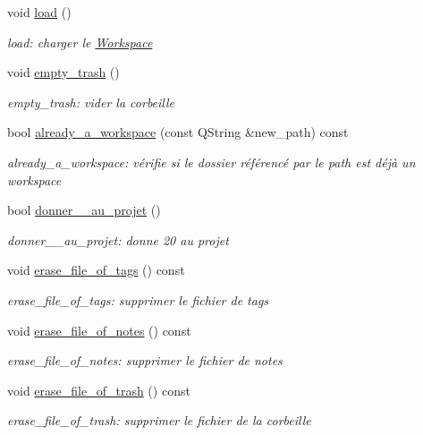 \begin{DoxyCompactItemize}
void \hyperlink{classworkspace_1_1_workspace_af3d7148dc6d3a11887196d24fa078fcb}{load} ()
\begin{DoxyCompactList}\small\item\em load\-: charger le \hyperlink{classworkspace_1_1_workspace}{Workspace} \end{DoxyCompactList}\item 
void \hyperlink{classworkspace_1_1_workspace_a23bf5733ad13d7d6579ab993061c5d4f}{empty\-\_\-trash} ()
\begin{DoxyCompactList}\small\item\em empty\-\_\-trash\-: vider la corbeille \end{DoxyCompactList}\item 
bool \hyperlink{classworkspace_1_1_workspace_adab6c7f1f9c5352db90ec020da70ae11}{already\-\_\-a\-\_\-workspace} (const Q\-String \&new\-\_\-path) const 
\begin{DoxyCompactList}\small\item\em already\-\_\-a\-\_\-workspace\-: vérifie si le dossier référencé par le path est déjà un workspace \end{DoxyCompactList}\item 
bool \hyperlink{classworkspace_1_1_workspace_a2d7689e3fece579fd9ec86f596b0b60e}{donner\-\_\-\_\-au\-\_\-projet} ()
\begin{DoxyCompactList}\small\item\em donner\-\_\-\_\-au\-\_\-projet\-: donne 20 au projet \end{DoxyCompactList}\item 
void \hyperlink{classworkspace_1_1_workspace_a03cc0063af4233671529564ae2bdf8e8}{erase\-\_\-file\-\_\-of\-\_\-tags} () const 
\begin{DoxyCompactList}\small\item\em erase\-\_\-file\-\_\-of\-\_\-tags\-: supprimer le fichier de tags \end{DoxyCompactList}\item 
void \hyperlink{classworkspace_1_1_workspace_a0ede1d8365f03440a98734a511fb64de}{erase\-\_\-file\-\_\-of\-\_\-notes} () const 
\begin{DoxyCompactList}\small\item\em erase\-\_\-file\-\_\-of\-\_\-notes\-: supprimer le fichier de notes \end{DoxyCompactList}\item 
void \hyperlink{classworkspace_1_1_workspace_aa183b1533e93538bca6c2fbedb82433b}{erase\-\_\-file\-\_\-of\-\_\-trash} () const 
\begin{DoxyCompactList}\small\item\em erase\-\_\-file\-\_\-of\-\_\-trash\-: supprimer le fichier de la corbeille \end{DoxyCompactList}\item 

\end{DoxyCompactItemize}
